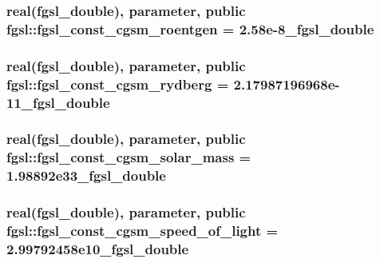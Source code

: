 \hypertarget{classfgsl_a081808c3b3b7297c71e015034c089d04}{
\subsubsection[{fgsl\-\_\-const\-\_\-cgsm\-\_\-roentgen}]{\setlength{\rightskip}{0pt plus 5cm}real({\bf fgsl\-\_\-double}), parameter, public fgsl\-::fgsl\-\_\-const\-\_\-cgsm\-\_\-roentgen = 2.\-58e-\/8\-\_\-fgsl\-\_\-double}}\label{classfgsl_a081808c3b3b7297c71e015034c089d04}
\hypertarget{classfgsl_a0f2cb7b75a4fd58c54e5a0b794da13b6}{
\subsubsection[{fgsl\-\_\-const\-\_\-cgsm\-\_\-rydberg}]{\setlength{\rightskip}{0pt plus 5cm}real({\bf fgsl\-\_\-double}), parameter, public fgsl\-::fgsl\-\_\-const\-\_\-cgsm\-\_\-rydberg = 2.\-17987196968e-\/11\-\_\-fgsl\-\_\-double}}\label{classfgsl_a0f2cb7b75a4fd58c54e5a0b794da13b6}
\hypertarget{classfgsl_a41afd20c5be47db2d713c42cac018572}{
\subsubsection[{fgsl\-\_\-const\-\_\-cgsm\-\_\-solar\-\_\-mass}]{\setlength{\rightskip}{0pt plus 5cm}real({\bf fgsl\-\_\-double}), parameter, public fgsl\-::fgsl\-\_\-const\-\_\-cgsm\-\_\-solar\-\_\-mass = 1.\-98892e33\-\_\-fgsl\-\_\-double}}\label{classfgsl_a41afd20c5be47db2d713c42cac018572}
\hypertarget{classfgsl_a5b4812e235747b48af51d2e576dfa469}{
\subsubsection[{fgsl\-\_\-const\-\_\-cgsm\-\_\-speed\-\_\-of\-\_\-light}]{\setlength{\rightskip}{0pt plus 5cm}real({\bf fgsl\-\_\-double}), parameter, public fgsl\-::fgsl\-\_\-const\-\_\-cgsm\-\_\-speed\-\_\-of\-\_\-light = 2.\-99792458e10\-\_\-fgsl\-\_\-double}}\label{classfgsl_a5b4812e235747b48af51d2e576dfa469}
